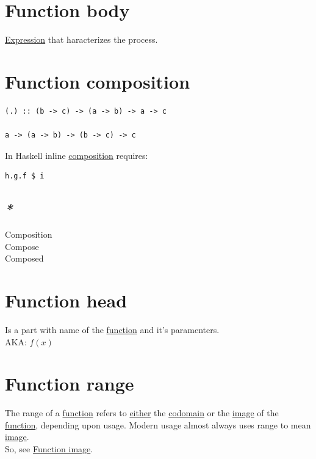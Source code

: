 \documentclass[a4paper,14pt,oneside]{book}
\begin{document}
\section{\label{org1e7d36e}Function body}
\label{sec:org23623c4}
\hyperref[orgade06d7]{Expression} that haracterizes the process.\\

\section{\label{org40611b4}Function composition}
\label{sec:org198a202}
\begin{verbatim}
(.) :: (b -> c) -> (a -> b) -> a -> c

a -> (a -> b) -> (b -> c) -> c
\end{verbatim}

In Haskell inline \hyperref[org309d77e]{composition} requires:\\
\begin{verbatim}
h.g.f $ i
\end{verbatim}

\subsection{\emph{*}}
\label{sec:org5c56795}

\label{org33bb08f}Composition\\
\label{orge7c5c9b}Compose\\
\label{org08ee05c}Composed\\

\section{\label{org1dbf609}Function head}
\label{sec:org78fa2dc}
Is a part with name of the \hyperref[org9530a6b]{function} and it's paramenters.\\
AKA: \(f(x)\)\\

\section{\label{orgf30026a}Function range}
\label{sec:org8bceb41}
The range of a \hyperref[org9530a6b]{function} refers to \hyperref[orga1183c5]{either} the \hyperref[orgaa1c608]{codomain} or the \hyperref[orgc34e368]{image} of the \hyperref[org9530a6b]{function}, depending upon usage. Modern usage almost always uses range to mean \hyperref[orgc34e368]{image}.\\
So, see \hyperref[org2ca41a7]{Function image}.\\
\end{document}
